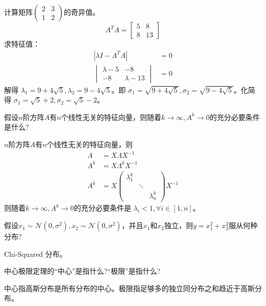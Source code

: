 \begin{problem}
	计算矩阵$\begin{pmatrix}2&3\\1&2\end{pmatrix}$的奇异值。
	\solution \[A^TA = \begin{bmatrix}
		5 & 8 \\
		8 & 13
	\end{bmatrix}\]
	求特征值：\begin{align*}
		|\lambda I - A^TA| &= 0\\
		\begin{vmatrix}
			\lambda - 5 & -8 \\
			-8 & \lambda - 13
		\end{vmatrix} &= 0
	\end{align*}
	解得 $\lambda_1 = 9 + 4\sqrt{5}, \lambda_2 = 9 - 4\sqrt{5}$。即 $\sigma_1 = \sqrt{9 + 4\sqrt{5}}, \sigma_2 = \sqrt{9 - 4\sqrt{5}}$。化简得 $\sigma_1 = \sqrt{5} + 2, \sigma_2 = \sqrt{5} - 2$。
\end{problem}

\begin{problem}
	假设$n$阶方阵$A$有$n$个线性无关的特征向量，则随着$k\to \infty,A^k\to 0$的充分必要条件是什么?
\end{problem}
\begin{solution}
	$n$阶方阵$A$有$n$个线性无关的特征向量，则 $$\begin{aligned}
		A &= X\Lambda X^{-1} \\	
		A^k &= X \Lambda^k X^{-1}\\
		A^k &= X \begin{pmatrix}  
			\lambda_1^k &  &  \\  
			 & \ddots & \\  
			 &  & \lambda_n^k  
		\end{pmatrix} X^{-1} 
	\end{aligned}$$
	则随着$k\to \infty,A^k\to 0$的充分必要条件是 $\lambda_i < 1,\forall i\in [1, n]$。
\end{solution}


\begin{problem}
	假设$x_1\sim \mathcal{N}(0,\sigma^2),x_2\sim\mathcal{N}(0,\sigma^2)$，并且$x_1$和$x_2$独立，则$y=x_1^2+x_2^2$服从何种分布?
\end{problem}
\begin{solution}
	Chi-Squared 分布。
\end{solution}


\begin{problem}
	中心极限定理的“中心”是指什么?“极限”是指什么?
\end{problem}
\begin{solution}
	中心指高斯分布是所有分布的中心。极限指足够多的独立同分布之和趋近于高斯分布。
\end{solution}



